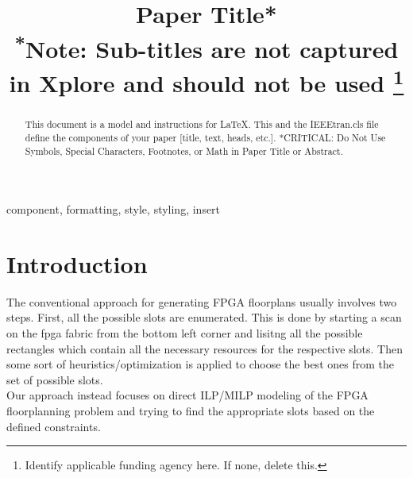 \documentclass[conference]{IEEEtran}
\begin{document}
\title{Paper Title*\\
{\footnotesize \textsuperscript{*}Note: Sub-titles are not captured in Xplore and
should not be used}
\thanks{Identify applicable funding agency here. If none, delete this.}
}

\author{
\and
{}
}

\maketitle

\begin{abstract}
This document is a model and instructions for \LaTeX.
This and the IEEEtran.cls file define the components of your paper [title, text, heads, etc.]. *CRITICAL: Do Not Use Symbols, Special Characters, Footnotes, 
or Math in Paper Title or Abstract.
\end{abstract}

\begin{IEEEkeywords}
component, formatting, style, styling, insert
\end{IEEEkeywords}

\section{Introduction}
The conventional approach for generating FPGA floorplans usually involves two steps. First, all the possible slots are enumerated. This is done by starting a scan on the fpga fabric from the bottom left corner and lisitng all the possible rectangles which contain all the necessary resources for the respective slots. Then some sort of heuristics/optimization is applied to choose the best ones from the set of possible slots.\\
Our approach instead focuses on direct ILP/MILP modeling of the FPGA floorplanning problem and trying to find the appropriate slots based on the defined constraints.\\
\end{document}
